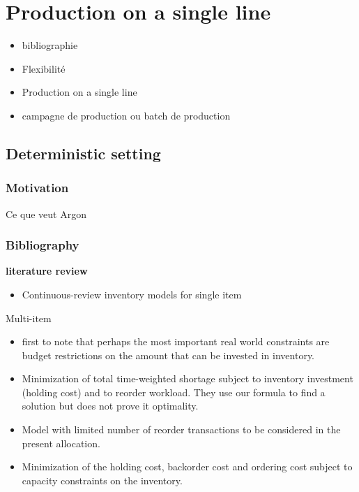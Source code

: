 \chapter{Production on a single line}
\label{chap:lot-size:single-line}


\begin{itemize}
  \item bibliographie
  \item Flexibilité
  \item Production on a single line
  \item campagne de production ou batch de production
\end{itemize}



\section{Deterministic setting}

\subsection{Motivation}

Ce que veut Argon

\subsection{Bibliography}

\textbf{literature review}

\begin{itemize}
   \item \cite{Gayon2016} Continuous-review inventory models for single item
\end{itemize} 

Multi-item

\begin{itemize}
  \item \cite{Hadley1963} first to note that perhaps the most important real world constraints are budget restrictions on the amount that can be invested in inventory.
  \item \cite{Schrady1971} Minimization of total time-weighted shortage subject to inventory investment (holding cost) and to reorder workload. They use our formula to find a solution but does not prove it optimality.
  \item \cite{Daeschner1975} Model with limited number of reorder transactions to be considered in the present allocation.
  \item \cite{Ohno2001} Minimization of the holding cost, backorder cost and ordering cost subject to capacity constraints on the inventory.
\end{itemize}


